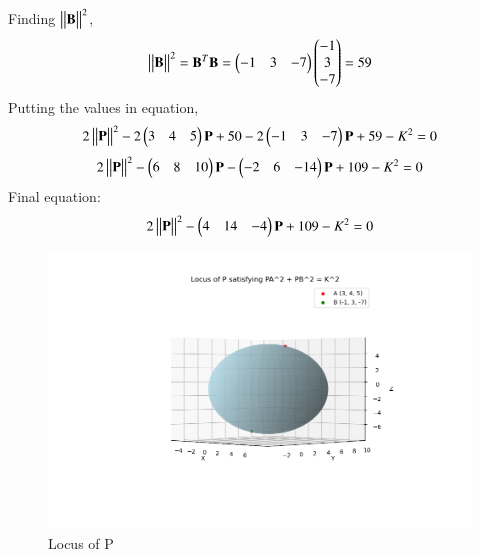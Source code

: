 \documentclass[journal]{IEEEtran}
\numberwithin{equation}{enumi}
\numberwithin{figure}{enumi}
\begin{document}
Finding $\begin{vmatrix}\begin{vmatrix}\mathbf{B}\end{vmatrix}\end{vmatrix}^2$,
\begin{align}
\begin{vmatrix}\begin{vmatrix}\mathbf{B}\end{vmatrix}\end{vmatrix}^2=\mathbf{B}^T\mathbf{B}=\begin{pmatrix}-1&3&-7\end{pmatrix}\begin{pmatrix}-1\\3\\-7\end{pmatrix}=59
\end{align}
Putting the values in equation, 
\begin{align}
	2\begin{vmatrix}\begin{vmatrix}\mathbf{P}\end{vmatrix}\end{vmatrix}^2  -2\begin{pmatrix}3&4&5\end{pmatrix}\mathbf{P}+50-2\begin{pmatrix}-1&3&-7\end{pmatrix}\mathbf{P}+59-K^2=0
\end{align}
\begin{align}
	2\begin{vmatrix}\begin{vmatrix}\mathbf{P}\end{vmatrix}\end{vmatrix}^2  -\begin{pmatrix}6&8&10\end{pmatrix}\mathbf{P}-\begin{pmatrix}-2&6&-14\end{pmatrix}\mathbf{P}+109-K^2=0
\end{align}
Final equation:
\begin{align}
	2\begin{vmatrix}\begin{vmatrix}\mathbf{P}\end{vmatrix}\end{vmatrix}^2  -\begin{pmatrix}4&14&-4\end{pmatrix}\mathbf{P}+109-K^2=0
\end{align}\begin{figure}[h!]
   \centering
   \includegraphics[width=1\linewidth]{Figure_1.png}
	\caption{Locus of P }
   \label{stemplot}
\end{figure}
\end{document}
